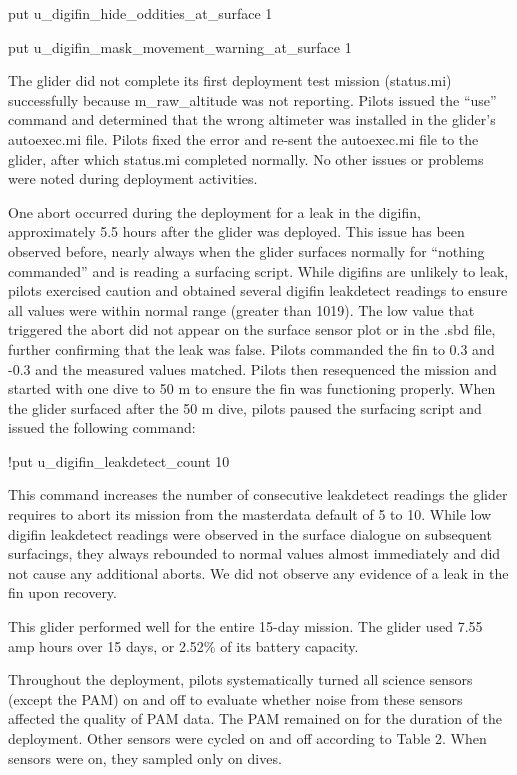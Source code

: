 \documentclass[
  letterpaper,
  DIV=11,
  numbers=noendperiod]{scrartcl}
\begin{document}
put u\_digifin\_hide\_oddities\_at\_surface 1

put u\_digifin\_mask\_movement\_warning\_at\_surface 1

The glider did not complete its first deployment test mission
(status.mi) successfully because m\_raw\_altitude was not reporting.
Pilots issued the ``use'' command and determined that the wrong
altimeter was installed in the glider's autoexec.mi file. Pilots fixed
the error and re-sent the autoexec.mi file to the glider, after which
status.mi completed normally. No other issues or problems were noted
during deployment activities.

One abort occurred during the deployment for a leak in the digifin,
approximately 5.5 hours after the glider was deployed. This issue has
been observed before, nearly always when the glider surfaces normally
for ``nothing commanded'' and is reading a surfacing script. While
digifins are unlikely to leak, pilots exercised caution and obtained
several digifin leakdetect readings to ensure all values were within
normal range (greater than 1019). The low value that triggered the abort
did not appear on the surface sensor plot or in the .sbd file, further
confirming that the leak was false. Pilots commanded the fin to 0.3 and
-0.3 and the measured values matched. Pilots then resequenced the
mission and started with one dive to 50 m to ensure the fin was
functioning properly. When the glider surfaced after the 50 m dive,
pilots paused the surfacing script and issued the following command:

!put u\_digifin\_leakdetect\_count 10

This command increases the number of consecutive leakdetect readings the
glider requires to abort its mission from the masterdata default of 5 to
10. While low digifin leakdetect readings were observed in the surface
dialogue on subsequent surfacings, they always rebounded to normal
values almost immediately and did not cause any additional aborts. We
did not observe any evidence of a leak in the fin upon recovery.

This glider performed well for the entire 15-day mission. The glider
used 7.55 amp hours over 15 days, or 2.52\% of its battery capacity.

Throughout the deployment, pilots systematically turned all science
sensors (except the PAM) on and off to evaluate whether noise from these
sensors affected the quality of PAM data. The PAM remained on for the
duration of the deployment. Other sensors were cycled on and off
according to Table 2. When sensors were on, they sampled only on dives.
\end{document}
